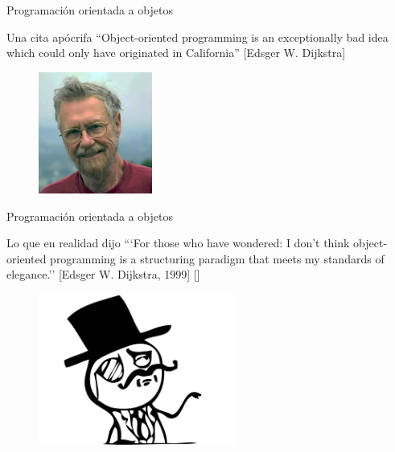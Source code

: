
\begin{frame}{Programación orientada a objetos}
  \small
  \begin{block}
    {\centering Una cita apócrifa}
    \centering
    ``Object-oriented programming is an exceptionally bad
    idea which could only have originated in California''
    [Edsger W. Dijkstra]
  \end{block}

  \begin{figure}
    \centering
    \includegraphics[height=4cm]{pics/dijkstra.jpg}
  \end{figure}
\end{frame}

\begin{frame}{Programación orientada a objetos}
  \small
  \begin{block}
    {\centering Lo que en realidad dijo}
    \centering
    ```For those who have wondered: I don't think object-oriented
    programming is a structuring paradigm that meets my standards of
    elegance.'' [Edsger W. Dijkstra, 1999]
    [\href{http://www.cs.utexas.edu/users/EWD/transcriptions/EWD12xx/EWD1284.html}
      {}]
  \end{block}

  \begin{figure}
    \centering
    \includegraphics[height=5cm]{pics/like-a-sir.png}
  \end{figure}
\end{frame}

